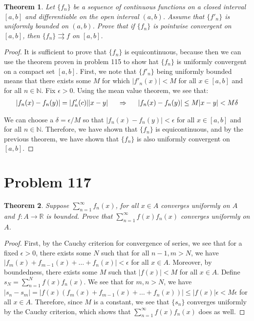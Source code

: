 \documentclass[psamsfonts]{amsart}
\newtheorem{thm}{Theorem}[section]
\theoremstyle{definition}
\theoremstyle{remark}
\numberwithin{equation}{section}
\begin{document}
\begin{thm}
Let $\{ f_n \}$ be a sequence of continuous functions on a closed interval $[a,b]$ and differentiable on the open interval $(a,b)$. Assume that $\{ f'_n \}$ is uniformly bounded on $(a,b)$. Prove that if $\{ f_n \}$ is pointwise convergent on $[a,b]$, then $\{ f_n \} \rightrightarrows f$ on $[a,b]$.
\end{thm}

\begin{proof}
It is sufficient to prove that $\{ f_n \}$ is equicontinuous, because then we can use the theorem proven in problem 115 to show hat $\{ f_n \}$ is uniformly convergent on a compact set $[a,b]$. First, we note that $\{ f'_n \}$ being uniformly bounded means that there exists some $M$ for which $|f'_n(x)| < M$ for all $x \in [a,b]$ and for all $n \in \mathbb{N}$. Fix $\epsilon > 0$. Using the mean value theorem, we see that:
\begin{eqnarray}
|f_n(x) - f_n(y)| = |f'_n(c)| |x-y| \hspace{0.5cm} \Rightarrow \hspace{0.5cm} |f_n(x) - f_n(y)| \leq M |x-y| < M \delta 
\end{eqnarray}

We can choose a $\delta = \epsilon/ M$ so that $|f_n(x) - f_n(y)| < \epsilon$ for all $x \in [a,b]$ and for all $n \in \mathbb{N}$. Therefore, we have shown that $\{ f_n \}$ is equicontinuous, and by the previous theorem, we have shown that $\{ f_n \}$ is also uniformly convergent on $[a,b]$. 
\end{proof}

\section{Problem 117}

\begin{thm}
Suppose $\sum_{n=1}^\infty f_n(x)$, for all $x \in A$ converges uniformly on $A$ and $f: A \to \mathbb{R}$ is bounded. Prove that $\sum_{n=1}^\infty f(x) f_n(x)$ converges uniformly on $A$. 
\end{thm}

\begin{proof}
First, by the Cauchy criterion for convergence of series, we see that for a fixed $\epsilon > 0$, there exists some $N$ such that for all $n-1,m > N$, we have $|f_m(x) + f_{m-1}(x) + \ldots + f_{n}(x)| < \epsilon$ for all $x \in A$. Moreover, by boundedness, there exists some $M$ such that $|f(x)| < M$ for all $x \in A$. Define $s_N = \sum_{n=1}^N f(x) f_n(x)$. We see that for $m,n > N$, we have $|s_n - s_m | = |f(x) (f_m(x) + f_{m-1}(x) + \ldots + f_n(x)) | \leq |f(x)| \epsilon < M \epsilon$ for all $x \in A$. Therefore, since $M$ is a constant, we see that $\{ s_n \}$ converges uniformly by the Cauchy criterion, which shows that $\sum_{n=1}^\infty f(x) f_n(x)$ does as well.
\end{proof}
\end{document}
